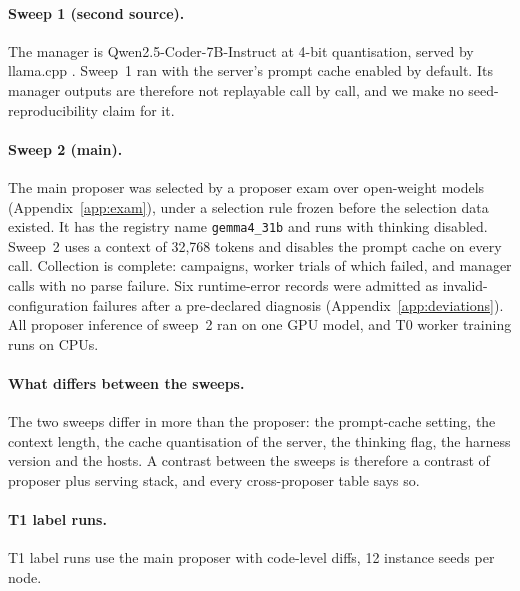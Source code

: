 \paragraph{Sweep 1 (second source).}
The manager is Qwen2.5-Coder-7B-Instruct \citep{hui2024qwencoder} at 4-bit quantisation, served by llama.cpp \citep{llamacpp}. Sweep~1 ran with the server's prompt cache enabled by default. Its manager outputs are therefore not replayable call by call, and we make no seed-reproducibility claim for it.

\paragraph{Sweep 2 (main).}
The main proposer was selected by a proposer exam over open-weight models (Appendix~\ref{app:exam}), under a selection rule frozen before the selection data existed. It has the registry name \texttt{gemma4\_31b} and runs with thinking disabled.  Sweep~2 uses a context of 32{,}768 tokens and disables the prompt cache on every call. Collection is complete: \SweepTwoCampaigns{} campaigns, \SweepTwoTrials{} worker trials of which \SweepTwoFailures{} failed, and \SweepTwoLLMCalls{} manager calls with no parse failure. Six runtime-error records were admitted as invalid-configuration failures after a pre-declared diagnosis (Appendix~\ref{app:deviations}). All proposer inference of sweep~2 ran on one GPU model, and T0 worker training runs on CPUs.

\paragraph{What differs between the sweeps.}
The two sweeps differ in more than the proposer: the prompt-cache setting, the context length, the cache quantisation of the server, the thinking flag, the harness version and the hosts. A contrast between the sweeps is therefore a contrast of proposer plus serving stack, and every cross-proposer table says so.

\paragraph{T1 label runs.}
T1 label runs use the main proposer with code-level diffs, 12 instance seeds per node. 

